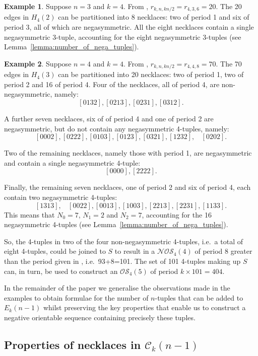 \documentclass[a4paper,11pt]{article}
\theoremstyle{plain}
\theoremstyle{definition}
\newtheorem{example}{Example}[section]
\theoremstyle{remark}
\begin{document}
\begin{example}  \label{example:n3k4}
Suppose $n=3$ and $k=4$. From \cite[Table 2]{Mitchell25a}, $r_{k,n,kn/2}=r_{4,3,6}=20$.  The 20
edges in $H_4(2)$ can be partitioned into 8 necklaces: two of period 1 and six of period 3, all of
which are negasymmetric.  All the eight necklaces contain a single negasymmetric 3-tuple,
accounting for the eight negasymmetric 3-tuples (see Lemma~\ref{lemma:number_of_nega_tuples}).
\end{example}

\begin{example}  \label{example:n4k4}
Suppose $n=4$ and $k=4$. From \cite[Table 2]{Mitchell25a}, $r_{k,n,kn/2}=r_{4,4,8}=70$.  The 70
edges in $H_4(3)$ can be partitioned into 20 necklaces: two of period 1, two of period 2 and 16 of
period 4. Four of the necklaces, all of period 4, are non-negasymmetric, namely:
\[ [0132], [0213], [0231], [0312]. \]

A further seven necklaces, six of of period 4 and one of period 2 are negasymmetric, but do not
contain any negasymmetric 4-tuples, namely:
\[ [0002], [0222], [0103], [0123], [0321], [1232],~~~~[0202]. \]

Two of the remaining necklaces, namely those with period 1, are negasymmetric and contain a single
negasymmetric 4-tuple:
\[ [0000], [2222]. \]

Finally, the remaining seven necklaces, one of period 2 and six of period 4, each contain two
negasymmetric 4-tuples:
\[ [1313],~~~~[0022], [0013], [1003], [2213], [2231], [1133]. \]
This means that $N_0=7$, $N_1=2$ and $N_2=7$, accounting for the 16 negasymmetric
4-tuples (see Lemma~\ref{lemma:number_of_nega_tuples}).

So, the 4-tuples in two of the four non-negasymmetric 4-tuples, i.e.\ a total of eight 4-tuples,
could be joined to $S$ to result in a $\mathcal{NOS}_4(4)$ of period 8 greater than the period
given in \cite[Table 3]{Mitchell25a}, i.e.\ 93+8=101. The set of 101 4-tuples making up $S$ can, in
turn, be used to construct an $\mathcal{OS}_4(5)$ of period $k\times 101=404$.
\end{example}

In the remainder of the paper we generalise the observations made in the examples to
obtain formulae for the number of $n$-tuples that can be added to $E_k(n-1)$ whilst preserving the
key properties that enable us to construct a negative orientable sequence containing precisely
these tuples.

\subsection{Properties of necklaces in \texorpdfstring{$\mathcal{C}_k(n-1)$}{Ck(n-1)}}
\end{document}
